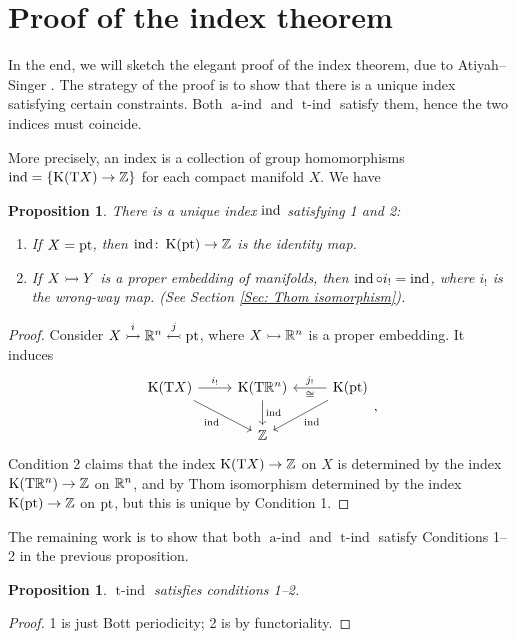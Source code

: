 \documentclass[reqno]{scrartcl}
\newtheorem{proposition}[theorem]{Proposition}
\theoremstyle{definition}
\theoremstyle{remark}
\newcommand{\aind}{\operatorname{a-ind}}
\newcommand{\tind}{\operatorname{t-ind}}
\begin{document}
\section{Proof of the index theorem}
In the end, we will sketch the elegant proof of the index theorem, due to Atiyah--Singer \cite{atiyahsinger1}. The strategy of the proof is to show that there is a unique index satisfying certain constraints. Both $\aind$ and $\tind$ satisfy them, hence the two indices must coincide.

More precisely, an index is a collection of group homomorphisms $\operatorname{ind}=\{\operatorname{K}(\mathrm{T}X)\to\mathbb{Z}\}$ for each compact manifold $X$. We have
\begin{proposition}
There is a unique index $\operatorname{ind}$ satisfying 1 and 2:
\begin{enumerate}
\item If $X=\operatorname{pt}$, then $\operatorname{ind}\colon\operatorname{K}(\operatorname{pt})\to\mathbb{Z}$ is the identity map.
\item If $X\rightarrowtail Y$ is a proper embedding of manifolds, then $\operatorname{ind}\circ i_!=\operatorname{ind}$, where $i_!$ is the wrong-way map. (See Section \ref{Sec: Thom isomorphism}).
\end{enumerate}
\end{proposition}

\begin{proof}Consider $X\overset{i}{\rightarrowtail}\mathbb{R}^n\overset{j}{\leftarrowtail}\operatorname{pt}$, where $X\rightarrowtail\mathbb{R}^n$ is a proper embedding. It induces
\[ \begin{tikzcd}
\K(\mathrm{T}X) \arrow[r, "i_!"] \arrow[rd, "\ind"'] & \K(\mathrm{T}\R^n) \arrow[d, "\ind"] & \K(\pt) \arrow[ld, "\ind"] \arrow[l, "j_!"', "\cong"] \\
                                            & \Z                          &                                               
\end{tikzcd}, \]
Condition 2 claims that the index $\operatorname{K}(\mathrm{T}X)\to\mathbb{Z}$ on $X$ is determined by the index $\operatorname{K}(\mathrm{T}\mathbb{R}^n)\to\mathbb{Z}$ on $\mathbb{R}^n$, and by Thom isomorphism determined by the index $\operatorname{K}(\operatorname{pt})\to\mathbb{Z}$ on $\operatorname{pt}$, but this is unique by Condition 1.
\end{proof}

The remaining work is to show that both $\aind$ and $\tind$ satisfy Conditions 1--2 in the previous proposition.

\begin{proposition}
$\tind$ satisfies conditions 1--2.
\end{proposition}

\begin{proof}1 is just Bott periodicity; 2 is by functoriality.
\end{proof}
\end{document}
